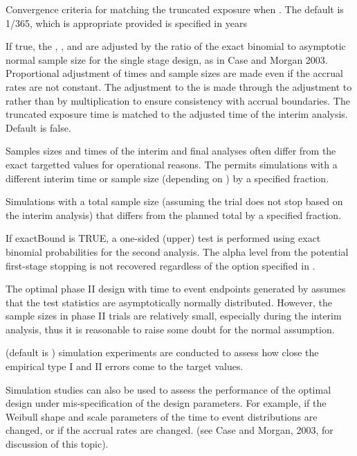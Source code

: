 \begin{Arguments}
\begin{ldescription}
\item[\code{e1conv}] Convergence criteria for matching the truncated
exposure when .  The default is 1/365, which
is appropriate provided  is specified in years
\item[\code{CMadj}] If true, the , , and  are adjusted by
the ratio of the exact binomial to asymptotic normal sample size for
the single stage design, as in Case and Morgan 2003.  Proportional
adjustment of times and sample sizes are made even if the accrual rates
are not constant. The adjustment to the  is made through the
adjustment to  rather than by multiplication to ensure consistency
with accrual boundaries.  The truncated exposure time is matched to the
adjusted time of the interim analysis. Default is false.

\item[\code{attainI}] Samples sizes and times of the interim and final
analyses often differ from the exact targetted values for operational
reasons. The  permits simulations with a
different interim time or sample size (depending on
) by a specified fraction.
\item[\code{attainT}] Simulations with a
total sample size (assuming the trial does not stop based on
the interim analysis) that differs from the planned total  by a specified fraction.
\item[\code{exactBound}] If exactBound is TRUE, a one-sided (upper) test is
performed using exact binomial probabilities for the second analysis.
The alpha level from the potential first-stage stopping is not
recovered regardless of the  option specified in .

\end{ldescription}
\end{Arguments}
\begin{Details}\relax
The optimal phase II design with time to event endpoints generated by
 assumes that the test statistics are asymptotically
normally distributed. However, the sample sizes in phase II trials are
relatively small, especially during the interim analysis, thus it is
reasonable to raise some doubt for the normal assumption.

(default is ) simulation experiments are
conducted to assess how close the empirical type I and II errors come
to the target values. 

Simulation studies can also be used to assess the performance of the
optimal design under mis-specification of the design parameters. For
example,  if the Weibull
shape and scale parameters of the time to event distributions are
changed, or if  the accrual rates are changed. (see Case and Morgan,
2003, for discussion of this topic).
\end{Details}
